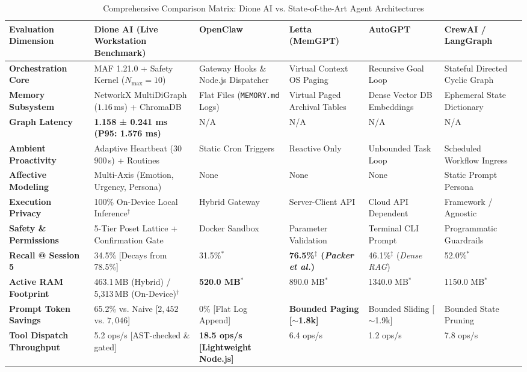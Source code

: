 \documentclass[conference,a4paper]{IEEEtran}
\begin{document}
\begin{table}[!t]
\caption{Comprehensive Comparison Matrix: Dione AI vs. State-of-the-Art Agent Architectures}
\label{tab:comparison}
\centering
\begin{tabularx}{\textwidth}{lXXXXX}
\toprule
\textbf{Evaluation Dimension} & \textbf{Dione AI (Live Workstation Benchmark)} & \textbf{OpenClaw} & \textbf{Letta (MemGPT)} & \textbf{AutoGPT} & \textbf{CrewAI / LangGraph} \\
\midrule
\textbf{Orchestration Core} & MAF 1.21.0 + Safety Kernel ($N_{\text{max}}=10$) & Gateway Hooks \& Node.js Dispatcher & Virtual Context OS Paging & Recursive Goal Loop & Stateful Directed Cyclic Graph \\
\textbf{Memory Subsystem} & NetworkX MultiDiGraph ($1.16$\,ms) + ChromaDB & Flat Files (\texttt{MEMORY.md} Logs) & Virtual Paged Archival Tables & Dense Vector DB Embeddings & Ephemeral State Dictionary \\
\textbf{Graph Latency} & \textbf{1.158 ± 0.241 ms (P95: 1.576 ms)} & N/A & N/A & N/A & N/A \\
\textbf{Ambient Proactivity} & Adaptive Heartbeat ($30$\text{--}$900$\,s) + Routines & Static Cron Triggers & Reactive Only & Unbounded Task Loop & Scheduled Workflow Ingress \\
\textbf{Affective Modeling} & Multi-Axis (Emotion, Urgency, Persona) & None & None & None & Static Prompt Persona \\
\textbf{Execution Privacy} & 100\% On-Device Local Inference$^\dagger$ & Hybrid Gateway & Server-Client API & Cloud API Dependent & Framework / Agnostic \\
\textbf{Safety \& Permissions} & 5-Tier Poset Lattice + Confirmation Gate & Docker Sandbox & Parameter Validation & Terminal CLI Prompt & Programmatic Guardrails \\
\textbf{Recall @ Session 5} & 34.5\% [Decays from 78.5\%] & 31.5\%$^*$ & \textbf{76.5\%$^\ddagger$ (\textit{Packer et al.})} & 46.1\%$^\ddagger$ (\textit{Dense RAG}) & 52.0\%$^*$ \\
\textbf{Active RAM Footprint} & 463.1\,MB (Hybrid) / 5,313\,MB (On-Device)$^\dagger$ & \textbf{520.0 MB$^*$} & 890.0 MB$^*$ & 1340.0 MB$^*$ & 1150.0 MB$^*$ \\
\textbf{Prompt Token Savings} & 65.2\% vs. Naive [$2{,}452$ vs. $7{,}046$] & 0\% [Flat Log Append] & \textbf{Bounded Paging [$\sim$1.8k]} & Bounded Sliding [$\sim$1.9k] & Bounded State Pruning \\
\textbf{Tool Dispatch Throughput} & 5.2 ops/s [AST-checked \& gated] & \textbf{18.5 ops/s [Lightweight Node.js]} & 6.4 ops/s & 1.2 ops/s & 7.8 ops/s \\

\end{tabularx}
\end{table}
\end{document}
